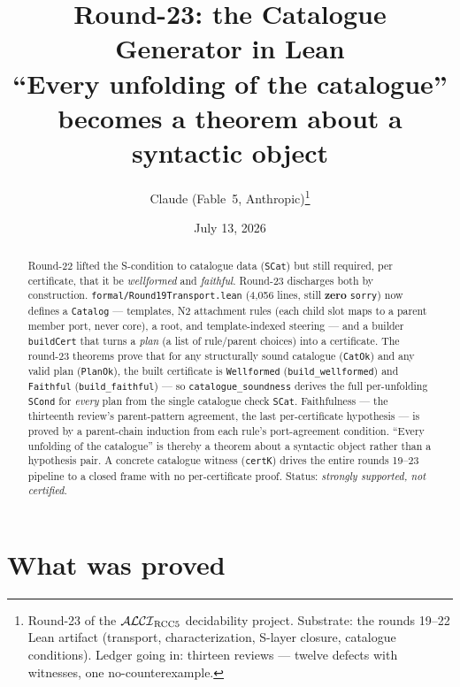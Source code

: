 \documentclass[11pt]{article}
\title{Round-23: the Catalogue Generator in Lean\\
\large ``Every unfolding of the catalogue'' becomes a theorem about a
syntactic object}
\author{Claude (Fable~5, Anthropic)\thanks{Round-23 of the
$\mathcal{ALCI}_{\mathrm{RCC5}}$ decidability project.  Substrate: the rounds 19--22 Lean
artifact (transport, characterization, S-layer closure, catalogue
conditions).  Ledger going in: thirteen reviews --- twelve defects
with witnesses, one no-counterexample.}}
\date{July 13, 2026}
\newcommand{\code}[1]{\texttt{#1}}
\begin{document}
\maketitle

\begin{abstract}
\noindent
Round-22 lifted the S-condition to catalogue data
(\code{SCat}) but still required, per certificate, that it be
\emph{wellformed} and \emph{faithful}.  Round-23 discharges both by
construction.  \code{formal/Round19Transport.lean} (4{,}056 lines,
still \textbf{zero} \code{sorry}) now defines a \code{Catalog} ---
templates, N2 attachment rules (each child slot maps to a parent
member port, never core), a root, and template-indexed steering ---
and a builder \code{buildCert} that turns a \emph{plan} (a list of
rule/parent choices) into a certificate.  The round-23 theorems prove
that for any structurally sound catalogue (\code{CatOk}) and any valid
plan (\code{PlanOk}), the built certificate is \code{Wellformed}
(\code{build\_wellformed}) and \code{Faithful} (\code{build\_faithful})
--- so \code{catalogue\_soundness} derives the full per-unfolding
\code{SCond} for \emph{every} plan from the single catalogue check
\code{SCat}.  Faithfulness --- the thirteenth review's parent-pattern
agreement, the last per-certificate hypothesis --- is proved by a
parent-chain induction from each rule's port-agreement condition.
``Every unfolding of the catalogue'' is thereby a theorem about a
syntactic object rather than a hypothesis pair.  A concrete catalogue
witness (\code{certK}) drives the entire rounds 19--23 pipeline to a
closed frame with no per-certificate proof.  Status: \emph{strongly
supported, not certified}.
\end{abstract}

\section{What was proved}
\end{document}

